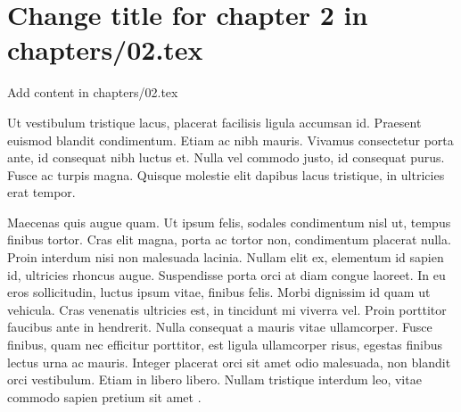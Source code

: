 \chapter{Change title for chapter 2 in chapters/02.tex}
Add content in chapters/02.tex

 Ut vestibulum tristique lacus, placerat facilisis ligula accumsan id. Praesent euismod blandit condimentum. Etiam ac nibh mauris. Vivamus consectetur porta ante, id consequat nibh luctus et. Nulla vel commodo justo, id consequat purus. Fusce ac turpis magna. Quisque molestie elit dapibus lacus tristique, in ultricies erat tempor.

Maecenas quis augue quam. Ut ipsum felis, sodales condimentum nisl ut, tempus finibus tortor. Cras elit magna, porta ac tortor non, condimentum placerat nulla. Proin interdum nisi non malesuada lacinia. Nullam elit ex, elementum id sapien id, ultricies rhoncus augue. Suspendisse porta orci at diam congue laoreet. In eu eros sollicitudin, luctus ipsum vitae, finibus felis. Morbi dignissim id quam ut vehicula. Cras venenatis ultricies est, in tincidunt mi viverra vel. Proin porttitor faucibus ante in hendrerit. Nulla consequat a mauris vitae ullamcorper. Fusce finibus, quam nec efficitur porttitor, est ligula ullamcorper risus, egestas finibus lectus urna ac mauris. Integer placerat orci sit amet odio malesuada, non blandit orci vestibulum. Etiam in libero libero. Nullam tristique interdum leo, vitae commodo sapien pretium sit amet \citep{Chomsky1957}. 